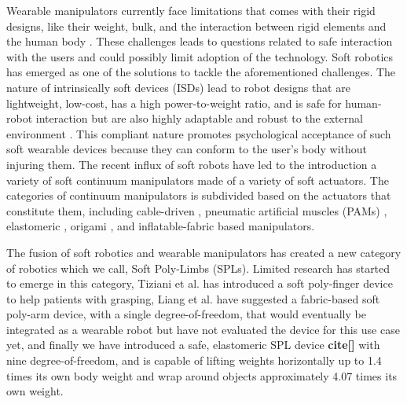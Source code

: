 \documentclass[letterpaper, 10 pt, conference]{ieeeconf}  %
\begin{document}
Wearable manipulators currently face limitations that comes with their rigid designs, like their weight, bulk, and the interaction between rigid elements and the human body \cite{delAma2012}. These challenges leads to questions related to safe interaction with the users and could possibly limit adoption of the technology. Soft robotics has emerged as one of the solutions to tackle the aforementioned challenges. The nature of intrinsically soft devices (ISDs) lead to robot designs that are lightweight, low-cost, has a high power-to-weight ratio, and is safe for human-robot interaction but are also highly adaptable and robust to the external environment \cite{polygerinos2016,laschi2016,rus2015}. This compliant nature promotes psychological acceptance of such soft wearable devices \cite{simpson2017,ding2018,sridar2017,oguntosin2015,park2014c} because they can conform to the user’s body without injuring them. The recent influx of soft robots have led to the introduction a variety of soft continuum manipulators made of a variety of soft actuators. The categories of continuum manipulators is subdivided based on the actuators that constitute them, including cable-driven \cite{mcMahan2005,calisti2011}, pneumatic artificial muscles (PAMs) \cite{walker2005,godage2016,yasmin2017,giannaccini2017}, elastomeric \cite{cianchetti2013,marchese2015,robertson2017,gong2018}, origami \cite{santoso2017}, and inflatable-fabric \cite{sanan2013,hawkes2017,ohta2017,best2016,liang2018,takeichi2017,kim2018,liang2017c} based manipulators. 

The fusion of soft robotics and wearable manipulators has created a new category of robotics which we call, Soft Poly-Limbs (SPLs). Limited research has started to emerge in this category, Tiziani et al. \cite{tiziani2017} has introduced a soft poly-finger device to help patients with grasping, Liang et al. \cite{liang2017c} have suggested a fabric-based soft poly-arm device, with a single degree-of-freedom, that would eventually be integrated as a wearable robot but have not evaluated the device for this use case yet, and finally we have introduced a safe, elastomeric SPL device \textbf{cite[]} with nine degree-of-freedom, and is capable of lifting weights horizontally up to 1.4 times its own body weight and wrap around objects approximately 4.07 times its own weight. 
\end{document}
